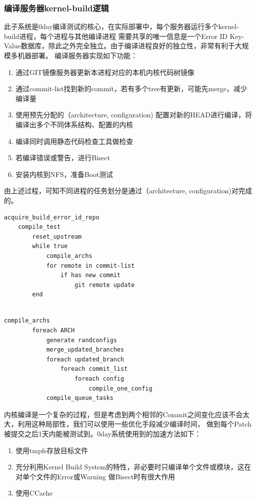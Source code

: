 \documentclass[a4paper]{article}
\begin{document}
\subsubsection{编译服务器kernel-build逻辑}
	此子系统是0day编译测试的核心，在实际部署中，每个服务器运行多个kernel-build进程，每个进程与其他编译进程
	需要共享的唯一信息是一个Error ID  Key-Value数据库，除此之外完全独立。由于编译进程良好的独立性，非常有利于大规模多机器部署。
	编译服务器实现如下功能：
	\begin{enumerate}
		\item 通过GIT镜像服务器更新本进程对应的本机内核代码树镜像
		\item
			通过commit-list找到新的commit，若有多个tree有更新，可能先merge，减少编译量
		\item 使用预先分配的（architecture, configuration)
			配置对新的HEAD进行编译，将编译出多个不同体系结构、配置的内核
		\item 编译同时调用静态代码检查工具做检查
		\item 若编译错误或警告，进行Bisect
		\item 安装内核到NFS，准备Boot测试
	\end{enumerate}
	由上述过程，可知不同进程的任务划分是通过（architecture,
	configuration)对完成的。


	\begin{Verbatim}[frame=single]
	acquire_build_error_id_repo
	compile_test
		reset_upstream
		while true
			compile_archs
			for remote in commit-list
				if has new commit
					git remote update
		end
				
	\end{Verbatim}

	\begin{Verbatim}[frame=single]
	compile_archs
		foreach ARCH
			generate randconfigs
			merge_updated_branches
			foreach updated_branch
				foreach commit_list
					foreach config
						compile_one_config
			compile_queue_tasks
	\end{Verbatim}

	内核编译是一个复杂的过程，但是考虑到两个相邻的Commit之间变化应该不会太大，利用这种局部性，我们可以使用一些优化手段减少编译时间，
	做到每个Patch被提交之后1天内能被测试到。0day系统使用到的加速方法如下：
	\begin{enumerate}
		\item 使用tmpfs存放目标文件
		\item 充分利用Kernel Build
			System的特性，非必要时只编译单个文件或模块，这在对单个文件的Error或Warning
			做Bisect时有很大作用
		\item 使用CCache
	\end{enumerate}
\end{document}
